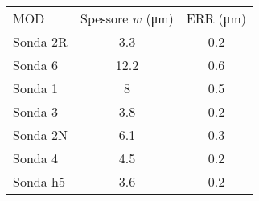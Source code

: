     \begin{tabular}{lcc}
        \toprule
        MOD & Spessore $w$ (\si{\micro\metre}) & ERR (\si{\micro\metre})\\
        \colrule
        Sonda 2R & 3.3 & 0.2\\
        Sonda 6 & 12.2 & 0.6\\
        Sonda 1 & 8 & 0.5\\
        Sonda 3 & 3.8 & 0.2\\
        Sonda 2N & 6.1 & 0.3\\
        Sonda 4 & 4.5 & 0.2\\
        Sonda h5 & 3.6 & 0.2\\
        \toprule
    \end{tabular}
